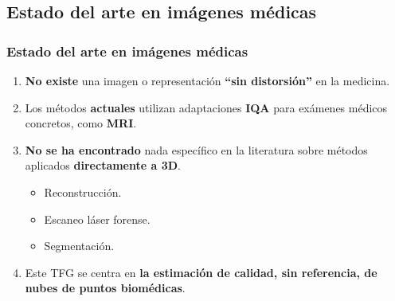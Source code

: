 \subsection{Estado del arte en imágenes médicas}
\begin{frame}
  \frametitle{Estado del arte en imágenes médicas}
  \begin{enumerate}
    \item \textbf{No existe} una imagen o representación \textbf{``sin distorsión''} en la medicina.
    \item Los métodos \textbf{actuales} utilizan adaptaciones \textbf{IQA} para 
      exámenes médicos concretos, como \textbf{MRI}.
    \item \textbf{No se ha encontrado} nada específico en la literatura sobre 
      métodos aplicados \textbf{directamente a 3D}.
      \begin{itemize}
        \item Reconstrucción.
        \item Escaneo láser forense.
        \item Segmentación.
      \end{itemize}
    \item Este TFG se centra en \textbf{la estimación de calidad, sin referencia, de nubes de puntos biomédicas}. 
  \end{enumerate}
\end{frame}
